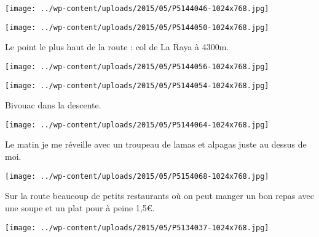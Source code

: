  

 

\begin{center} \texttt{[image: ../wp-content/uploads/2015/05/P5144046-1024x768.jpg]} \end{center}

 

 

\begin{center} \texttt{[image: ../wp-content/uploads/2015/05/P5144050-1024x768.jpg]} \end{center}

 

 Le point le plus haut de la route : col de La Raya à 4300m. 

 

\begin{center} \texttt{[image: ../wp-content/uploads/2015/05/P5144056-1024x768.jpg]} \end{center}

 

 

\begin{center} \texttt{[image: ../wp-content/uploads/2015/05/P5144054-1024x768.jpg]} \end{center}

 

 Bivouac dans la descente. 

 

\begin{center} \texttt{[image: ../wp-content/uploads/2015/05/P5144064-1024x768.jpg]} \end{center}

 

 Le matin je me réveille avec un troupeau de lamas et alpagas juste au dessus de moi. 

 

\begin{center} \texttt{[image: ../wp-content/uploads/2015/05/P5154068-1024x768.jpg]} \end{center}

 

 Sur la route beaucoup de petits restaurants où on peut manger un bon repas avec une soupe et un plat pour à peine 1,5€. 

 

\begin{center} \texttt{[image: ../wp-content/uploads/2015/05/P5134037-1024x768.jpg]} \end{center}

